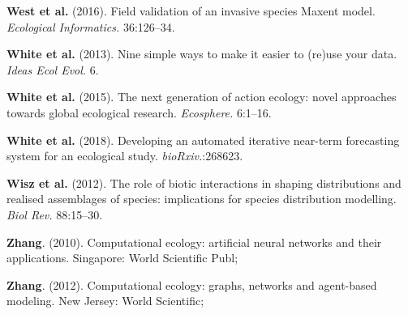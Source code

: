\documentclass[12pt]{article}
\begin{document}
\leavevmode\hypertarget{ref-WestKuma16}{}%
\textbf{West et al.} (2016). Field validation of an invasive species
Maxent model. \emph{Ecological Informatics.} 36:126--34.

\leavevmode\hypertarget{ref-WhitBald13}{}%
\textbf{White et al.} (2013). Nine simple ways to make it easier to
(re)use your data. \emph{Ideas Ecol Evol.} 6.

\leavevmode\hypertarget{ref-WhitSutt15}{}%
\textbf{White et al.} (2015). The next generation of action ecology:
novel approaches towards global ecological research. \emph{Ecosphere.}
6:1--16.

\leavevmode\hypertarget{ref-WhitYenn18}{}%
\textbf{White et al.} (2018). Developing an automated iterative
near-term forecasting system for an ecological study.
\emph{bioRxiv.}:268623.

\leavevmode\hypertarget{ref-WiszPott12}{}%
\textbf{Wisz et al.} (2012). The role of biotic interactions in shaping
distributions and realised assemblages of species: implications for
species distribution modelling. \emph{Biol Rev.} 88:15--30.

\leavevmode\hypertarget{ref-Zhan10}{}%
\textbf{Zhang}. (2010). Computational ecology: artificial neural
networks and their applications. Singapore: World Scientific Publ;

\leavevmode\hypertarget{ref-Zhan12}{}%
\textbf{Zhang}. (2012). Computational ecology: graphs, networks and
agent-based modeling. New Jersey: World Scientific;
\end{document}
